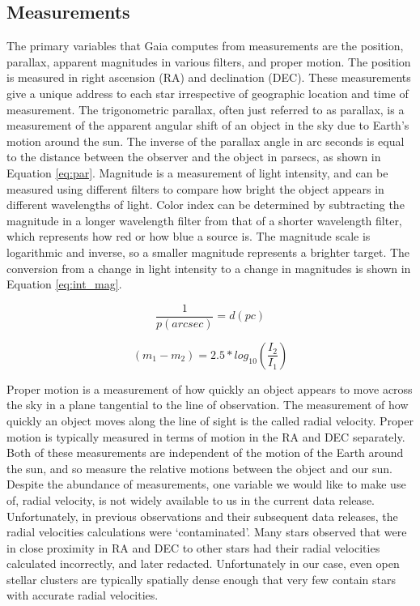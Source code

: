 \documentclass[onecolumn,table,xcdraw,super]{aastex631}
\newcommand{\beq}{\begin{equation}}
\newcommand{\eeq}{\end{equation}}
\begin{document}
\subsection{Measurements} \label{sec:measurements}
The primary variables that Gaia computes from measurements are the position, parallax, apparent magnitudes in various filters, and proper motion. The position is measured in right ascension (RA) and declination (DEC). These measurements give a unique address to each star irrespective of geographic location and time of measurement. The trigonometric parallax, often just referred to as parallax, is a measurement of the apparent angular shift of an object in the sky due to Earth's motion around the sun. The inverse of the parallax angle in arc seconds is equal to the distance between the observer and the object in parsecs, as shown in Equation \ref{eq:par}. Magnitude is a measurement of light intensity, and can be measured using different filters to compare how bright the object appears in different wavelengths of light. Color index can be determined by subtracting the magnitude in a longer wavelength filter from that of a shorter wavelength filter, which represents how red or how blue a source is. The magnitude scale is logarithmic and inverse, so a smaller magnitude represents a brighter target. The conversion from a change in light intensity to a change in magnitudes is shown in Equation \ref{eq:int_mag}.

\beq
\label{eq:par}
\frac{1}{p (arcsec)} = d (pc)
\eeq

\beq
\label{eq:int_mag}
\left(m_1-m_2\right) = 2.5*log_{10}\left(\frac{I_2}{I_1}\right)
\eeq

Proper motion is a measurement of how quickly an object appears to move across the sky in a plane tangential to the line of observation. The measurement of how quickly an object moves along the line of sight is the called radial velocity. Proper motion is typically measured in terms of motion in the RA and DEC separately. Both of these measurements are independent of the motion of the Earth around the sun, and so measure the relative motions between the object and our sun. Despite the abundance of measurements, one variable we would like to make use of, radial velocity, is not widely available to us in the current data release. Unfortunately, in previous observations and their subsequent data releases, the radial velocities calculations were `contaminated'. Many stars observed that were in close proximity in RA and DEC to other stars had their radial velocities calculated incorrectly, and later redacted. Unfortunately in our case, even open stellar clusters are typically spatially dense enough that very few contain stars with accurate radial velocities.
\end{document}
